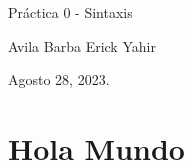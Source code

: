 \documentclass{article}
\newcommand{\autorName}{Avila Barba Erick Yahir} %
\newcommand{\fecha}{Agosto 28, 2023.} %
\newcommand{\tareaName}{Práctica 0 - Sintaxis} %
\begin{document}
\newpage

\begin{center}
    \huge
    \tareaName
    
    \vspace{0.5cm}
    \large
    \autorName

    \vspace{0.3cm}
    \large
    \fecha 
\end{center}
\vspace{0.5cm}

\section*{Hola Mundo}
\end{document}
